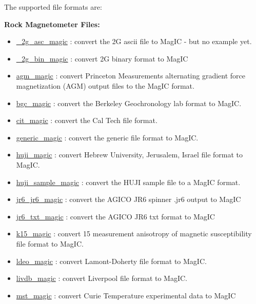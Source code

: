 \documentclass[11pt]{book}
\begin{document}
{{The supported file formats are:

{\bf Rock Magnetometer Files:}

\begin{itemize}
\item \href{http://pmagpy.github.io/PmagPy_MagIC.html#_2g_asc_magic}{\_2g\_asc\_magic} : convert the 2G ascii file to MagIC - but no example yet.
\item \href{http://pmagpy.github.io/PmagPy_MagIC.html#_2g_bin_magic}{\_2g\_bin\_magic} : convert 2G binary format to MagIC
\item \href{http://pmagpy.github.io/PmagPy_MagIC.html#agm_magic}{agm\_magic} : convert Princeton Measurements alternating gradient force magnetization (AGM) output files to the MagIC format.
\item \href{http://pmagpy.github.io/PmagPy_MagIC.html#bgc_magic}{bgc\_magic} : convert the Berkeley Geochronology lab format to MagIC.
\item \href{http://pmagpy.github.io/PmagPy_MagIC.html#cit_magic}{cit\_magic} : convert the Cal Tech file format.
\item \href{http://pmagpy.github.io/PmagPy_MagIC.html#generic_magic}{generic\_magic} : convert the generic file format to MagIC.
\item \href{http://pmagpy.github.io/PmagPy_MagIC.html#huji_magic}{huji\_magic} : convert Hebrew University, Jerusalem, Israel file format to MagIC.
\item \href{http://pmagpy.github.io/PmagPy_MagIC.html#huji_sample_magic}{huji\_sample\_magic} : convert the HUJI sample file to a MagIC format.
\item \href{http://pmagpy.github.io/PmagPy_MagIC.html#jr6_jr6}{jr6\_jr6\_magic} : convert the AGICO JR6 spinner .jr6 output to MagIC
\item \href{http://pmagpy.github.io/PmagPy_MagIC.html#jr6_txt_magic}{jr6\_txt\_magic} : convert the AGICO JR6 txt format to MagIC
\item \href{http://pmagpy.github.io/PmagPy_MagIC.html#k15_magic}{k15\_magic} : convert  15 measurement anisotropy of magnetic susceptibility file format to MagIC.
\item \href{http://pmagpy.github.io/PmagPy_MagIC.html#ldeo_magic}{ldeo\_magic} : convert Lamont-Doherty file format to MagIC.
\item \href{http://pmagpy.github.io/PmagPy_MagIC.html#livdb_magic}{livdb\_magic} : convert Liverpool file format to MagIC.
\item \href{http://pmagpy.github.io/PmagPy_MagIC.html#mst_magic}{mst\_magic} : convert Curie Temperature experimental data to MagIC

\end{itemize}}}
\end{document}
